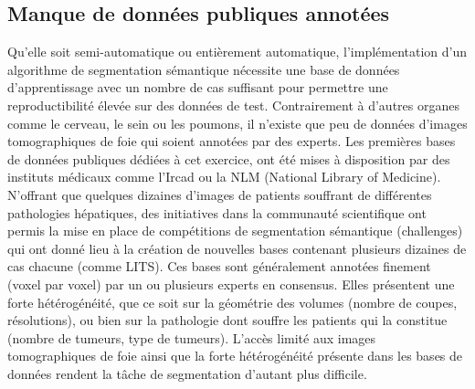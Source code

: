 \documentclass[]{memoir}
\begin{document}
\subsection{Manque de données publiques annotées}
Qu’elle soit semi-automatique ou entièrement automatique, l’implémentation d’un algorithme de segmentation sémantique nécessite une base de données d’apprentissage avec un nombre de cas suffisant pour permettre une reproductibilité élevée sur des données de test.
Contrairement à d’autres organes comme le cerveau, le sein ou les poumons, il n’existe que peu de données d’images tomographiques de foie qui soient annotées par des experts. Les premières bases de données publiques dédiées à cet exercice, ont été mises à disposition par des instituts médicaux comme l’Ircad ou la NLM (National Library of Medicine). N’offrant que quelques dizaines d’images de patients souffrant de différentes pathologies hépatiques, des initiatives dans la communauté scientifique ont permis la mise en place de compétitions de segmentation sémantique (challenges) qui ont donné lieu à la création de nouvelles bases contenant plusieurs dizaines de cas chacune (comme LITS). 
Ces bases sont généralement annotées finement (voxel par voxel) par un ou plusieurs experts en consensus. Elles présentent une forte hétérogénéité, que ce soit sur la géométrie des volumes (nombre de coupes, résolutions), ou bien sur la pathologie dont souffre les patients qui la constitue (nombre de tumeurs, type de tumeurs). 
L’accès limité aux images tomographiques de foie ainsi que la forte hétérogénéité présente dans les bases de données rendent la tâche de segmentation d’autant plus difficile.
\end{document}
